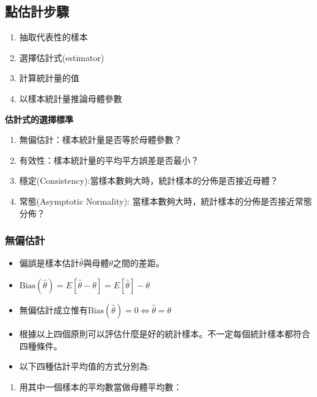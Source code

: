 \documentclass[hyperref,]{ctexart}
\providecommand{\tightlist}{%
  \setlength{\itemsep}{0pt}\setlength{\parskip}{0pt}}
\begin{document}
\hypertarget{ux9edeux4f30ux8a08ux6b65ux9a5f}{%
\subsection{點估計步驟}\label{ux9edeux4f30ux8a08ux6b65ux9a5f}}

\begin{enumerate}
\def\labelenumi{\arabic{enumi}.}
\tightlist
\item
  抽取代表性的樣本
\item
  選擇估計式(estimator)
\item
  計算統計量的值
\item
  以樣本統計量推論母體參數
\end{enumerate}

\textbf{估計式的選擇標準}

\begin{enumerate}
\def\labelenumi{\arabic{enumi}.}
\tightlist
\item
  無偏估計：樣本統計量是否等於母體參數？
\item
  有效性：樣本統計量的平均平方誤差是否最小？
\item
  穩定(Consistency):當樣本數夠大時，統計樣本的分佈是否接近母體？
\item
  常態(Asymptotic Normality):
  當樣本數夠大時，統計樣本的分佈是否接近常態分佈？
\end{enumerate}

\hypertarget{ux7121ux504fux4f30ux8a08}{%
\subsubsection{無偏估計}\label{ux7121ux504fux4f30ux8a08}}

\begin{itemize}
\item
  偏誤是樣本估計\(\hat{\theta}\)與母體\(\theta\)之間的差距。
\item
  \(\text{Bias}(\hat{\theta})=E[\hat{\theta}-\theta]=E[\hat{\theta}]-\theta\)
\item
  無偏估計成立惟有\(\text{Bias}(\hat{\theta})=0\Longleftrightarrow \hat{\theta}=\theta\)
\item
  根據以上四個原則可以評估什麼是好的統計樣本。不一定每個統計樣本都符合四種條件。
\item
  以下四種估計平均值的方式分別為:
\end{itemize}

\begin{enumerate}
\def\labelenumi{\arabic{enumi}.}
\tightlist
\item
  用其中一個樣本的平均數當做母體平均數：
\end{enumerate}
\end{document}
